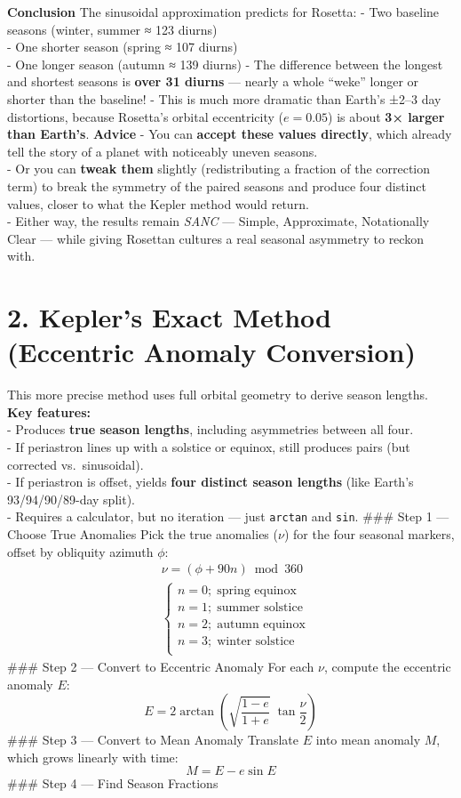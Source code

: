 \documentclass[
  letterpaper,
]{book}
\begin{document}
\textbf{Conclusion} The sinusoidal approximation predicts for Rosetta: -
Two baseline seasons (winter, summer ≈ 123 diurns)\\
- One shorter season (spring ≈ 107 diurns)\\
- One longer season (autumn ≈ 139 diurns) - The difference between the
longest and shortest seasons is \textbf{over 31 diurns} --- nearly a
whole ``weke'' longer or shorter than the baseline! - This is much more
dramatic than Earth's ±2--3 day distortions, because Rosetta's orbital
eccentricity (\(e=0.05\)) is about \textbf{3× larger than Earth's}.
\textbf{Advice} - You can \textbf{accept these values directly}, which
already tell the story of a planet with noticeably uneven seasons.\\
- Or you can \textbf{tweak them} slightly (redistributing a fraction of
the correction term) to break the symmetry of the paired seasons and
produce four distinct values, closer to what the Kepler method would
return.\\
- Either way, the results remain \emph{SANC} --- Simple, Approximate,
Notationally Clear --- while giving Rosettan cultures a real seasonal
asymmetry to reckon with.

\section{2. Kepler's Exact Method (Eccentric Anomaly
Conversion)}\label{keplers-exact-method-eccentric-anomaly-conversion}

This more precise method uses full orbital geometry to derive season
lengths. \textbf{Key features:}\\
- Produces \textbf{true season lengths}, including asymmetries between
all four.\\
- If periastron lines up with a solstice or equinox, still produces
pairs (but corrected vs.~sinusoidal).\\
- If periastron is offset, yields \textbf{four distinct season lengths}
(like Earth's 93/94/90/89-day split).\\
- Requires a calculator, but no iteration --- just \texttt{arctan} and
\texttt{sin}. \#\#\# Step 1 --- Choose True Anomalies Pick the true
anomalies (\(\nu\)) for the four seasonal markers, offset by obliquity
azimuth \(\phi\): \[
\begin{align}
&\nu = (\phi + 90n) \bmod 360 \\[1em]
&\begin{cases}
n = 0; \;\text{spring equinox} \\
n = 1; \;\text{summer solstice} \\
n = 2; \;\text{autumn equinox} \\
n = 3; \;\text{winter solstice} \\
\end{cases}
\end{align}
\] \#\#\# Step 2 --- Convert to Eccentric Anomaly For each \(\nu\),
compute the eccentric anomaly \(E\): \[
E = 2 \arctan \!\left( \sqrt{\dfrac{1-e}{1+e}} \;\tan \dfrac{\nu}{2} \right)
\] \#\#\# Step 3 --- Convert to Mean Anomaly Translate \(E\) into mean
anomaly \(M\), which grows linearly with time: \[
M = E - e \sin E
\] \#\#\# Step 4 --- Find Season Fractions
\end{document}
